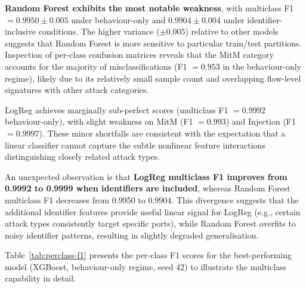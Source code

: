 \documentclass[12pt,a4paper]{report}
\begin{document}
\textbf{Random Forest exhibits the most notable weakness}, with multiclass F1 $= 0.9950 \pm 0.005$ under behaviour-only and $0.9904 \pm 0.004$ under identifier-inclusive conditions. The higher variance ($\pm 0.005$) relative to other models suggests that Random Forest is more sensitive to particular train/test partitions. Inspection of per-class confusion matrices reveals that the MitM category accounts for the majority of misclassifications (F1 $= 0.953$ in the behaviour-only regime), likely due to its relatively small sample count and overlapping flow-level signatures with other attack categories.

LogReg achieves marginally sub-perfect scores (multiclass F1 $= 0.9992$ behaviour-only), with slight weakness on MitM (F1 $= 0.993$) and Injection (F1 $= 0.9997$). These minor shortfalls are consistent with the expectation that a linear classifier cannot capture the subtle nonlinear feature interactions distinguishing closely related attack types.

An unexpected observation is that \textbf{LogReg multiclass F1 improves from 0.9992 to 0.9999 when identifiers are included}, whereas Random Forest multiclass F1 decreases from 0.9950 to 0.9904. This divergence suggests that the additional identifier features provide useful linear signal for LogReg (e.g., certain attack types consistently target specific ports), while Random Forest overfits to noisy identifier patterns, resulting in slightly degraded generalisation.

Table~\ref{tab:perclass-f1} presents the per-class F1 scores for the best-performing model (XGBoost, behaviour-only regime, seed 42) to illustrate the multiclass capability in detail.
\end{document}
